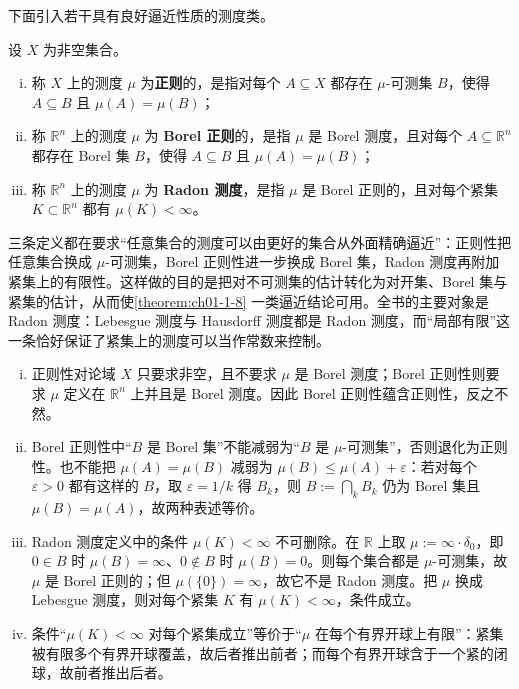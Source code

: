\documentclass[../../main.tex]{subfiles}
\begin{document}
下面引入若干具有良好逼近性质的测度类。

\begin{definition}\label{definition:ch01-1-9}
设 $X$ 为非空集合。
\begin{enumerate}[(i)]
\item 称 $X$ 上的测度 $\mu$ 为\textbf{正则}的，是指对每个 $A\subseteq X$ 都存在 $\mu$-可测集 $B$，使得 $A\subseteq B$ 且 $\mu(A)=\mu(B)$；
\item 称 $\mathbb{R}^{n}$ 上的测度 $\mu$ 为 \textbf{Borel 正则}的，是指 $\mu$ 是 Borel 测度，且对每个 $A\subseteq\mathbb{R}^{n}$ 都存在 Borel 集 $B$，使得 $A\subseteq B$ 且 $\mu(A)=\mu(B)$；
\item 称 $\mathbb{R}^{n}$ 上的测度 $\mu$ 为 \textbf{Radon 测度}，是指 $\mu$ 是 Borel 正则的，且对每个紧集 $K\subset\mathbb{R}^{n}$ 都有 $\mu(K)<\infty$。
\end{enumerate}
\end{definition}

\begin{remark}\label{remark:ch01-def-1-9-逼近动机}
三条定义都在要求“任意集合的测度可以由更好的集合从外面精确逼近”：正则性把任意集合换成 $\mu$-可测集，Borel 正则性进一步换成 Borel 集，Radon 测度再附加紧集上的有限性。这样做的目的是把对不可测集的估计转化为对开集、Borel 集与紧集的估计，从而使\cref{theorem:ch01-1-8} 一类逼近结论可用。全书的主要对象是 Radon 测度：Lebesgue 测度与 Hausdorff 测度都是 Radon 测度，而“局部有限”这一条恰好保证了紧集上的测度可以当作常数来控制。%
\end{remark}

\begin{remark}\label{remark:ch01-def-1-9-逼近条件}
\begin{enumerate}[(i)]
\item 正则性对论域 $X$ 只要求非空，且不要求 $\mu$ 是 Borel 测度；Borel 正则性则要求 $\mu$ 定义在 $\mathbb{R}^{n}$ 上并且是 Borel 测度。因此 Borel 正则性蕴含正则性，反之不然。
\item Borel 正则性中“$B$ 是 Borel 集”不能减弱为“$B$ 是 $\mu$-可测集”，否则退化为正则性。也不能把 $\mu(A)=\mu(B)$ 减弱为 $\mu(B)\leqslant\mu(A)+\varepsilon$：若对每个 $\varepsilon>0$ 都有这样的 $B$，取 $\varepsilon=1/k$ 得 $B_{k}$，则 $B:=\bigcap_{k}B_{k}$ 仍为 Borel 集且 $\mu(B)=\mu(A)$，故两种表述等价。
\item Radon 测度定义中的条件 $\mu(K)<\infty$ 不可删除。在 $\mathbb{R}$ 上取 $\mu:=\infty\cdot\delta_{0}$，即 $0\in B$ 时 $\mu(B)=\infty$、$0\notin B$ 时 $\mu(B)=0$。则每个集合都是 $\mu$-可测集，故 $\mu$ 是 Borel 正则的；但 $\mu(\{0\})=\infty$，故它不是 Radon 测度。把 $\mu$ 换成 Lebesgue 测度，则对每个紧集 $K$ 有 $\mu(K)<\infty$，条件成立。
\item 条件“$\mu(K)<\infty$ 对每个紧集成立”等价于“$\mu$ 在每个有界开球上有限”：紧集被有限多个有界开球覆盖，故后者推出前者；而每个有界开球含于一个紧的闭球，故前者推出后者。
\end{enumerate}
\end{remark}
\end{document}
